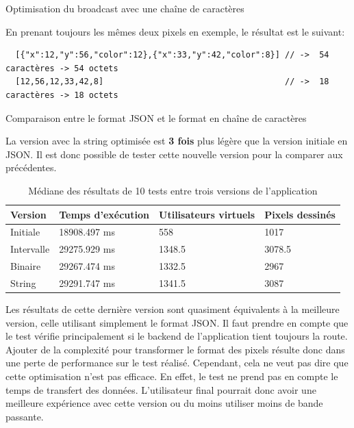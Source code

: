 \begin{listing}[H]
  \inputminted[highlightlines={5,6}, linenos]{ts}{assets/figures/opti-string.ts}
  \caption{Optimisation du broadcast avec une chaîne de caractères}
  \label{listing:opti-string}
\end{listing}

En prenant toujours les mêmes deux pixels en exemple, le résultat est le suivant:

\begin{listing}[H]
  \begin{verbatim}
  [{"x":12,"y":56,"color":12},{"x":33,"y":42,"color":8}] // ->  54 caractères -> 54 octets
  [12,56,12,33,42,8]                                     // ->  18 caractères -> 18 octets
\end{verbatim}
  \caption{Comparaison entre le format JSON et le format en chaîne de caractères}
  \label{listing:json-vs-string}
\end{listing}

La version avec la string optimisée est \textbf{3 fois} plus légère que la version initiale en JSON. Il est donc possible de tester cette nouvelle version pour la comparer aux précédentes.

\begin{table}[H]
  \centering
  \begin{tabular}{|l|l|l|l|}
    \hline
    \textbf{Version} & \textbf{Temps d'exécution} & \textbf{Utilisateurs virtuels} & \textbf{Pixels dessinés} \\ \hline
    Initiale         & 18908.497 ms               & 558                            & 1017                     \\ \hline
    Intervalle       & 29275.929 ms               & 1348.5                         & 3078.5                   \\ \hline
    Binaire          & 29267.474 ms               & 1332.5                         & 2967                     \\ \hline
    String           & 29291.747 ms               & 1341.5                         & 3087                     \\ \hline
  \end{tabular}
  \caption{Médiane des résultats de 10 tests entre trois versions de l'application}
  \label{table:third-opti-results}
\end{table}

Les résultats de cette dernière version sont quasiment équivalents à la meilleure version, celle utilisant simplement le format JSON. Il faut prendre en compte que le test vérifie principalement si le backend de l'application tient toujours la route. Ajouter de la complexité pour transformer le format des pixels résulte donc dans une perte de performance sur le test réalisé. Cependant, cela ne veut pas dire que cette optimisation n'est pas efficace. En effet, le test ne prend pas en compte le temps de transfert des données. L'utilisateur final pourrait donc avoir une meilleure expérience avec cette version ou du moins utiliser moins de bande passante.

